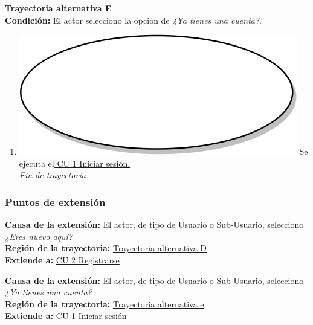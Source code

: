 \textbf{Trayectoria alternativa E} \label{cu1_1_ta_e}\\
\textbf{Condición:} El actor selecciono la opción de \textit{¿Ya tienes una cuenta?}.\\
 \begin{enumerate}[label=E\arabic*]
    \item {\includegraphics[scale=.05]{Capitulo3/img/proceso.png} Se ejecuta el\hyperref[cu1]{ CU 1 Iniciar sesión.}} \\
    \textit{Fin de trayectoria} \\
\end{enumerate}

\subsubsection{Puntos de extensión}
\noindent \textbf{Causa de la extensión:} El actor, de tipo de Usuario o Sub-Usuario, selecciono \textit{¿Eres nuevo aquí?} \\
\textbf{Región de la trayectoria:} \hyperref[cu1_1_ta_d]{Trayectoria alternativa D} \\
\textbf{Extiende a:} \hyperref[cu1_1]{CU 2 Registrarse} \\ \par

\noindent \textbf{Causa de la extensión:} El actor, de tipo de Usuario o Sub-Usuario, selecciono \textit{¿Ya tienes una cuenta?} \\
\textbf{Región de la trayectoria:} \hyperref[cu1_1_ta_e]{Trayectoria alternativa e} \\
\textbf{Extiende a:} \hyperref[cu1]{CU 1 Iniciar sesión}
